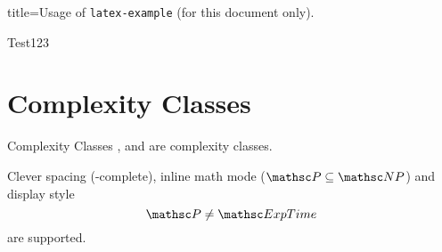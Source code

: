 \documentclass{article}
\begin{document}
\begin{tcblisting}{title=Usage of \texttt{latex-example} (for this document only).}
	\begin{latex-example}[lefthand width=3.5cm]{Test123}
	\end{latex-example}
\end{tcblisting}

\section{Complexity Classes}
\begin{latex-example}{Complexity Classes}
\PTime, \NP and  are complexity classes.

Clever spacing (\NP-complete),
inline math mode ($\PTime \subseteq \NP$)
and display style
\[
	\PTime \neq \ExpTime
\]
are supported.
\end{latex-example}
\end{document}
